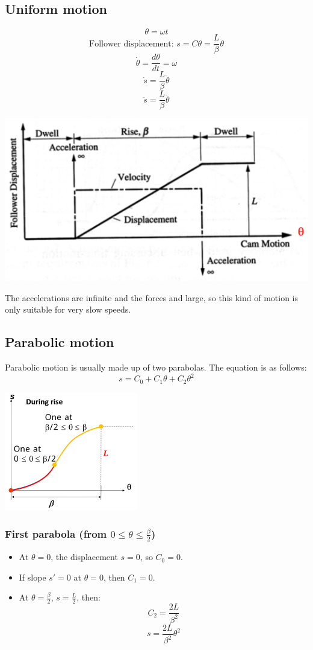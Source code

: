 \documentclass[11pt]{article}
\begin{document}
\subsection{Uniform motion}
\label{sec:org6a41d23}
\[\theta = \omega t\]
\[\text{Follower displacement: } s = C \theta = \frac{L}{\beta} \theta\]
\[\dot{\theta} = \frac{d \theta}{dt} = \omega\]
\[\dot{s} = \frac{L}{\beta} \dot{\theta}\]
\[\ddot{s} = \frac{L}{\beta} \ddot{\theta}\]

\begin{center}
\includegraphics[width=.9\linewidth]{./images/follower-uniform-motion.png}
\end{center}

The accelerations are infinite and the forces and large, so this kind of motion is only suitable for very slow speeds.

 \newpage
\subsection{Parabolic motion}
\label{sec:orgf224c85}
Parabolic motion is usually made up of two parabolas. The equation is as follows:
\[s = C_0 + C_1 \theta + C_2 \theta^2\]

\begin{center}
\includegraphics[height=14em]{./images/parabolic-motion-graph.png}
\end{center}
\subsubsection{First parabola (from \(0 \le \theta \le \frac{\beta}{2}\))}
\label{sec:org00c0092}
\begin{itemize}
\item At \(\theta = 0\), the displacement \(s = 0\), so \(C_0 = 0\).
\item If slope \(s' = 0\) at \(\theta = 0\), then \(C_1 = 0\).
\item At \(\theta = \frac{\beta}{2}\), \(s = \frac{L}{2}\), then:
\[C_2 = \frac{2L}{\beta^2}\]
\[s = \frac{2L}{\beta^2} \theta^2\]
\end{itemize}
\end{document}
